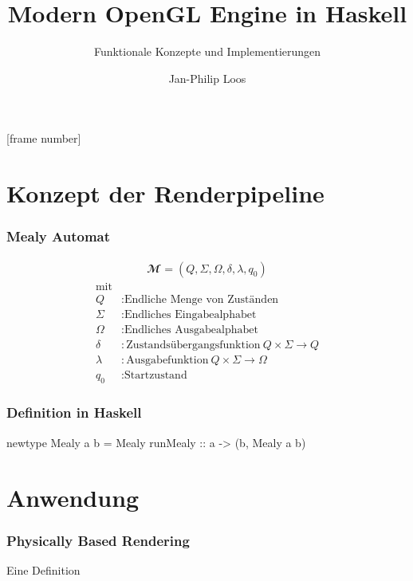 
[frame number]



\title[Haskell Engine]{Modern OpenGL Engine in Haskell}
\subtitle[Konzepte]{Funktionale Konzepte und Implementierungen}
\author{Jan-Philip Loos}
\date{\protect{}}
\maketitle
{}


\section{Konzept der Renderpipeline}
\begin{frame}
  \frametitle{Mealy Automat}
  \begin{Definition}
    \begin{align}
    \mathbfcal{M} = \left( Q, \Sigma, \Omega, \delta, \lambda, q_0 \right)
    \label{def:mealy-formal}
    \end{align}
    \begin{align*}
    	\text{mit}\\
    	Q &: \text{Endliche Menge von Zuständen} \\
    	\Sigma  &:\text{Endliches Eingabealphabet} \\
    	\Omega  &:\text{Endliches Ausgabealphabet} \\
    	\delta  &:\text{Zustandsübergangsfunktion}\ Q \times \Sigma \rightarrow Q \\
    	\lambda &:\text{Ausgabefunktion}\ Q \times \Sigma \rightarrow \Omega \\
    	q_0 &: \text{Startzustand}
    \end{align*}
  \end{Definition}
\end{frame}

\begin{frame}[fragile]
  \frametitle{Definition in Haskell}
  \begin{haskell}[label={lst:haskell-mealy},caption={[Definition Mealy in Haskell]Definition Mealy in Haskell\protect\footnotemark}]
    newtype Mealy a b = Mealy {
      runMealy :: a -> (b, Mealy a b)
    }
  \end{haskell}
\end{frame}

\section{Anwendung}
\begin{frame}
  \frametitle{Physically Based Rendering}
  \begin{Definition}
    Eine Definition
  \end{Definition}
\end{frame}



